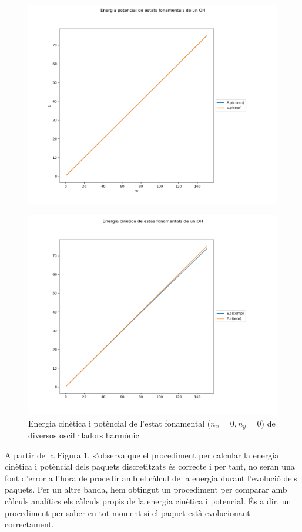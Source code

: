 \documentclass{article}
\begin{document}
\begin{figure}[H]
	\includegraphics[width=\textwidth]{Epotharm.png}
\end{figure}
\begin{figure}[H]
	\includegraphics[width=\textwidth]{Ecinharm.png}
	\caption{Energia cinètica i potèncial de l'estat fonamental (\(n_x=0,n_y=0\)) de diversos oscil·ladors harmònic}
\end{figure}

A partir de la Figura 1, s'observa que el procediment per calcular la energia cinètica i potèncial dels paquets discretitzats és correcte i per tant,
no seran una font d'error a l'hora de procedir amb el càlcul de la energia durant l'evolució dels paquets. Per un altre banda, hem obtingut un procediment
per comparar amb càlculs analítics els càlculs propis de la energia cinètica i potencial. És a dir, un procediment per saber en tot moment si el paquet 
està evolucionant correctament. 
\end{document}
